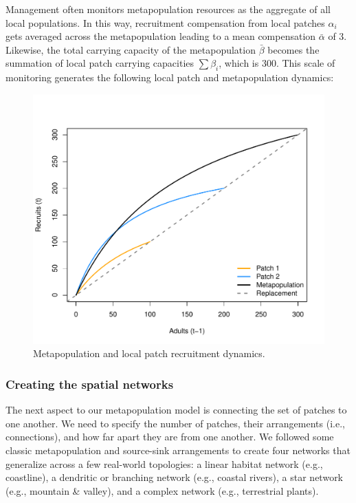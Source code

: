 \documentclass[]{article}
\begin{document}
Management often monitors metapopulation resources as the aggregate of
all local populations. In this way, recruitment compensation from local
patches \(\alpha_i\) gets averaged across the metapopulation leading to
a mean compensation \(\bar{\alpha}\) of 3. Likewise, the total carrying
capacity of the metapopulation \(\bar{\beta}\) becomes the summation of
local patch carrying capacities \(\sum\beta_i\), which is 300. This
scale of monitoring generates the following local patch and
metapopulation dynamics:

\begin{figure}[H]

{\centering \includegraphics{Managing_for_ecological_surprises_in_metapopulations_makeHTML_files/figure-latex/recruit curves-1} 

}

\caption{Metapopulation and local patch recruitment dynamics.}\label{fig:recruit curves}
\end{figure}

\hypertarget{creating-the-spatial-networks}{%
\subsubsection{Creating the spatial
networks}\label{creating-the-spatial-networks}}

The next aspect to our metapopulation model is connecting the set of
patches to one another. We need to specify the number of patches, their
arrangements (i.e., connections), and how far apart they are from one
another. We followed some classic metapopulation and source-sink
arrangements to create four networks that generalize across a few
real-world topologies: a linear habitat network (e.g., coastline), a
dendritic or branching network (e.g., coastal rivers), a star network
(e.g., mountain \& valley), and a complex network (e.g., terrestrial
plants).
\end{document}

